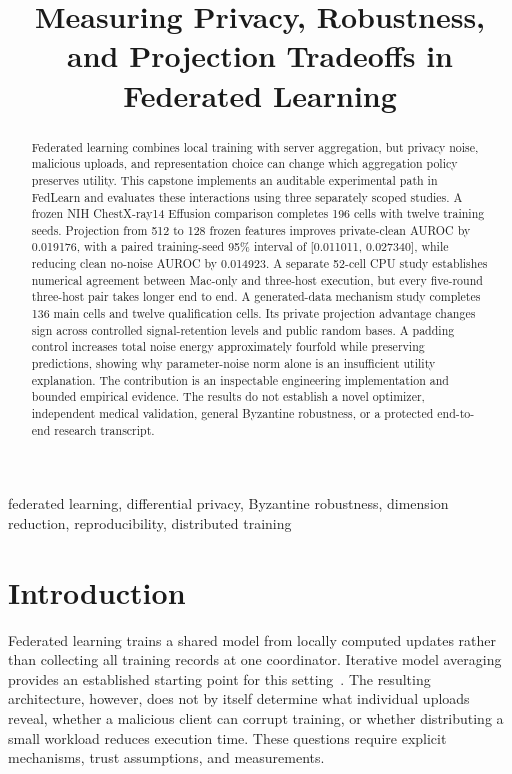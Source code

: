 \documentclass[conference,letterpaper]{IEEEtran}
\title{Measuring Privacy, Robustness, and Projection Tradeoffs in Federated Learning}
\author{\IEEEauthorblockN{Anurag Lnu}
\IEEEauthorblockA{MS in Computer Science\\Rochester Institute of Technology\\Rochester, New York, USA}}
\begin{document}
\maketitle

\begin{abstract}
Federated learning combines local training with server aggregation, but privacy noise, malicious uploads, and representation choice can change which aggregation policy preserves utility. This capstone implements an auditable experimental path in FedLearn and evaluates these interactions using three separately scoped studies. A frozen NIH ChestX-ray14 Effusion comparison completes 196 cells with twelve training seeds. Projection from 512 to 128 frozen features improves private-clean AUROC by 0.019176, with a paired training-seed 95\% interval of [0.011011, 0.027340], while reducing clean no-noise AUROC by 0.014923. A separate 52-cell CPU study establishes numerical agreement between Mac-only and three-host execution, but every five-round three-host pair takes longer end to end. A generated-data mechanism study completes 136 main cells and twelve qualification cells. Its private projection advantage changes sign across controlled signal-retention levels and public random bases. A padding control increases total noise energy approximately fourfold while preserving predictions, showing why parameter-noise norm alone is an insufficient utility explanation. The contribution is an inspectable engineering implementation and bounded empirical evidence. The results do not establish a novel optimizer, independent medical validation, general Byzantine robustness, or a protected end-to-end research transcript.
\end{abstract}

\begin{IEEEkeywords}
federated learning, differential privacy, Byzantine robustness, dimension reduction, reproducibility, distributed training
\end{IEEEkeywords}

\section{Introduction}
Federated learning trains a shared model from locally computed updates rather than collecting all training records at one coordinator. Iterative model averaging provides an established starting point for this setting~\cite{fedavg}. The resulting architecture, however, does not by itself determine what individual uploads reveal, whether a malicious client can corrupt training, or whether distributing a small workload reduces execution time. These questions require explicit mechanisms, trust assumptions, and measurements.
\end{document}
